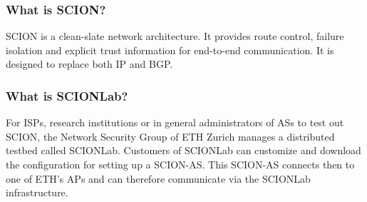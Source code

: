 \subsubsection{What is SCION?}

\acs{SCION} is a clean-slate network architecture. It provides route control, failure isolation and explicit trust information for end-to-end communication\cite{scion2019website}. It is designed to replace both \acs{IP} and \acs{BGP}. 

\subsubsection{What is SCIONLab?}

For \acp{ISP}, research institutions or in general administrators of \acp{AS} to test out \acs{SCION}, the Network Security Group of \acs{ETH} Zurich manages a distributed testbed called \acs{SCIONLab}. Customers of \acs{SCIONLab} can customize and download the configuration for setting up a \acs{SCION}-\ac{AS}. This \acs{SCION}-\ac{AS} connects then to one of \acs{ETH}'s \aclp{AP} and can therefore communicate  via the \acs{SCIONLab} infrastructure.
